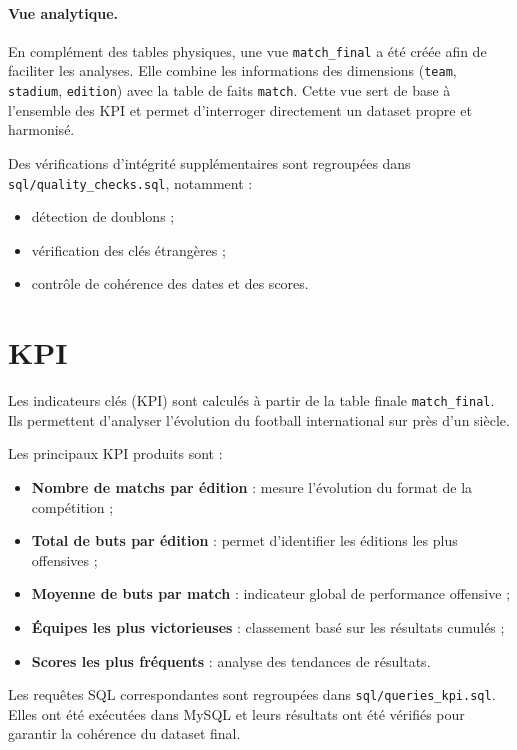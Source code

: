 \documentclass[12pt,a4paper]{article}
\begin{document}
\paragraph{Vue analytique.}

En complément des tables physiques, une vue \texttt{match\_final} a été créée afin de faciliter les analyses.  
Elle combine les informations des dimensions (\texttt{team}, \texttt{stadium}, \texttt{edition}) avec la table de faits \texttt{match}.  
Cette vue sert de base à l’ensemble des KPI et permet d’interroger directement un dataset propre et harmonisé.

Des vérifications d’intégrité supplémentaires sont regroupées dans \texttt{sql/quality\_checks.sql}, notamment :

\begin{itemize}
    \item détection de doublons ;
    \item vérification des clés étrangères ;
    \item contrôle de cohérence des dates et des scores.
\end{itemize}

\newpage
\section{KPI}

Les indicateurs clés (KPI) sont calculés à partir de la table finale \texttt{match\_final}.  
Ils permettent d’analyser l’évolution du football international sur près d’un siècle.

Les principaux KPI produits sont :

\begin{itemize}
    \item \textbf{Nombre de matchs par édition} : mesure l’évolution du format de la compétition ;
    \item \textbf{Total de buts par édition} : permet d’identifier les éditions les plus offensives ;
    \item \textbf{Moyenne de buts par match} : indicateur global de performance offensive ;
    \item \textbf{Équipes les plus victorieuses} : classement basé sur les résultats cumulés ;
    \item \textbf{Scores les plus fréquents} : analyse des tendances de résultats.
\end{itemize}

Les requêtes SQL correspondantes sont regroupées dans \texttt{sql/queries\_kpi.sql}.  
Elles ont été exécutées dans MySQL et leurs résultats ont été vérifiés pour garantir la cohérence du dataset final.
\end{document}
